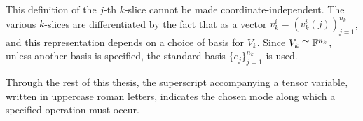 \documentclass[../Lael_John_MasterThesis_Draft.tex]{subfiles}
\begin{document}
\begin{observation}
    This definition of the $j$-th $k$-slice cannot be made coordinate-independent. The various $k$-slices are differentiated by the fact that as a vector $v_k^i = (v_k^i(j))_{j=1}^{n_k}$, and this representation depends on a choice of basis for $V_k$. Since $V_k \cong \mathbb{F}^{n_k}$, unless another basis is specified, the standard basis $\{e_j\}_{j=1}^{n_k}$ is used.
\end{observation}
\begin{remark}
    Through the rest of this thesis, the superscript accompanying a tensor variable, written in uppercase roman letters, indicates the chosen mode along which a specified operation must occur.
\end{remark}
\end{document}
